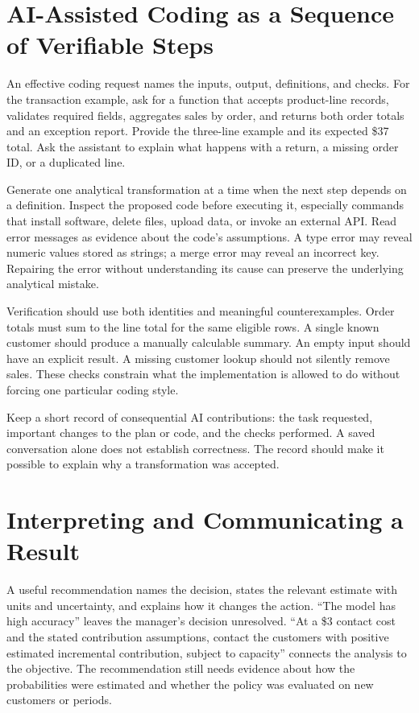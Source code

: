 \hypertarget{M01-ai-assisted-coding-as-a-sequence-of-verifiable-steps}{%
\section{AI-Assisted Coding as a Sequence of Verifiable
Steps}\label{M01-ai-assisted-coding-as-a-sequence-of-verifiable-steps}}

\noindent An effective coding request names the inputs, output, definitions, and
checks. For the transaction example, ask for a function that accepts
product-line records, validates required fields, aggregates sales by
order, and returns both order totals and an exception report. Provide
the three-line example and its expected \$37 total. Ask the assistant to
explain what happens with a return, a missing order ID, or a duplicated
line.

Generate one analytical transformation at a time when the next step
depends on a definition. Inspect the proposed code before executing it,
especially commands that install software, delete files, upload data, or
invoke an external API. Read error messages as evidence about the code's
assumptions. A type error may reveal numeric values stored as strings; a
merge error may reveal an incorrect key. Repairing the error without
understanding its cause can preserve the underlying analytical mistake.

Verification should use both identities and meaningful counterexamples.
Order totals must sum to the line total for the same eligible rows. A
single known customer should produce a manually calculable summary. An
empty input should have an explicit result. A missing customer lookup
should not silently remove sales. These checks constrain what the
implementation is allowed to do without forcing one particular coding
style.

Keep a short record of consequential AI contributions: the task
requested, important changes to the plan or code, and the checks
performed. A saved conversation alone does not establish correctness.
The record should make it possible to explain why a transformation was
accepted.

\hypertarget{M01-interpreting-and-communicating-a-result}{%
\section{Interpreting and Communicating a
Result}\label{M01-interpreting-and-communicating-a-result}}

\noindent A useful recommendation names the decision, states the relevant estimate
with units and uncertainty, and explains how it changes the action.
``The model has high accuracy'' leaves the manager's decision
unresolved. ``At a \$3 contact cost and the stated contribution
assumptions, contact the customers with positive estimated incremental
contribution, subject to capacity'' connects the analysis to the
objective. The recommendation still needs evidence about how the
probabilities were estimated and whether the policy was evaluated on new
customers or periods.

